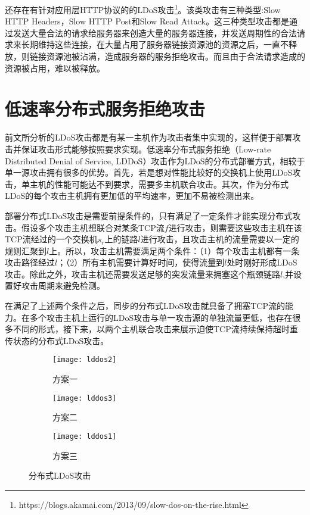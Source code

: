 还存在有针对应用层HTTP协议的的LDoS攻击\footnote{https://blogs.akamai.com/2013/09/slow-dos-on-the-rise.html}。该类攻击有三种类型:Slow HTTP Headers，Slow HTTP Post和Slow Read Attack。这三种类型攻击都是通过发送大量合法的请求给服务器来创造大量的服务器连接，并发送周期性的合法请求来长期维持这些连接，在大量占用了服务器链接资源池的资源之后，一直不释放，则链接资源池被沾满，造成服务器的服务拒绝攻击。而且由于合法请求造成的资源被占用，难以被释放。
\section{低速率分布式服务拒绝攻击}
前文所分析的LDoS攻击都是有某一主机作为攻击者集中实现的，这样便于部署攻击并保证攻击形式能够按照要求实现。低速率分布式服务拒绝（Low-rate Distributed Denial of Service, LDDoS）攻击作为LDoS的分布式部署方式，相较于单一源攻击拥有很多的优势。首先，若是想对性能比较好的交换机上使用LDoS攻击，单主机的性能可能达不到要求，需要多主机联合攻击。其次，作为分布式LDoS的每个攻击主机拥有更加低的平均速率，更加不易被检测出来。

部署分布式LDoS攻击是需要前提条件的，只有满足了一定条件才能实现分布式攻击。假设多个攻击主机想联合对某条TCP流$f$进行攻击，则需要这些攻击主机在该TCP流经过的一个交换机$s_r$上的链路$l$进行攻击，且攻击主机的流量需要以一定的规则汇聚到$l$上。所以，攻击主机需要满足两个条件：（1）每个攻击主机都有一条攻击路径经过$l$；（2）所有主机需要计算好时间，使得流量到$l$处时刚好形成LDoS攻击。除此之外，攻击主机还需要发送足够的突发流量来拥塞这个瓶颈链路$l$,并设置好攻击周期来避免检测。

在满足了上述两个条件之后，同步的分布式LDoS攻击就具备了拥塞TCP流的能力。在多个攻击主机上运行的LDoS攻击与单一攻击源的单独流量更低，也存在很多不同的形式，接下来，以两个主机联合攻击来展示迫使TCP流持续保持超时重传状态的分布式LDoS攻击。


\begin{figure}
    \vspace{-0.2in}
    \begin{subfigure}{1\textwidth}
        \centering
        \texttt{[image: lddos2]}
        \caption{方案一}
        \label{fig:lldos1}
    \end{subfigure}

    \begin{subfigure}{1\textwidth}
        \centering
        \texttt{[image: lddos3]}
        \caption{方案二}
        \label{fig:lldos2}
    \end{subfigure}

    \begin{subfigure}{1\textwidth}
        \centering
        \texttt{[image: lddos1]}
        \caption{方案三}
        \label{fig:lldos3}
    \end{subfigure}


    \caption{分布式LDoS攻击}
    \label{ffig:lldos}
\end{figure}


